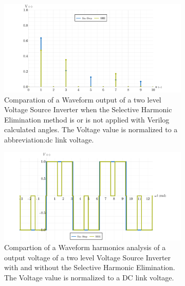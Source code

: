 \documentclass[a4paper, twoside, 11pt]{article}
\begin{document}
            \begin{figure}[htbp!]
                \centering
                \begin{subfigure}[t]{0.45\textwidth}
                    \includegraphics[width=1\textwidth]{src/png/ComparataionPlotSixStepVerilogSheHarmonics.png}
                    \caption{Comparation of a Waveform output of a two level Voltage Source Inverter when the Selective Harmonic Elimination method is or is not applied with Verilog calculated angles. The Voltage value is normalized to a \gls{abbreviation:dc} link voltage.}
                    \label{fig:ComparataionPlotSixStepVerilogSheHarmonics}
                \end{subfigure}
                \hspace{0.05\textwidth}
                \begin{subfigure}[t]{0.45\textwidth}
                    \includegraphics[width=1\textwidth]{src/png/ComparataionPlotSixStepVerilogSheWaveform.png}
                    \caption{Compartion of a Waveform harmonics analysis of a output voltage of a two level Voltage Source Inverter with and without the Selective Harmonic Elimination. The Voltage value is normalized to a DC link voltage.}
                    \label{fig:ComparataionPlotSixStepVerilogSheWaveform}
                \end{subfigure}
                \caption{}
            \end{figure}
            \FloatBarrier
\end{document}
